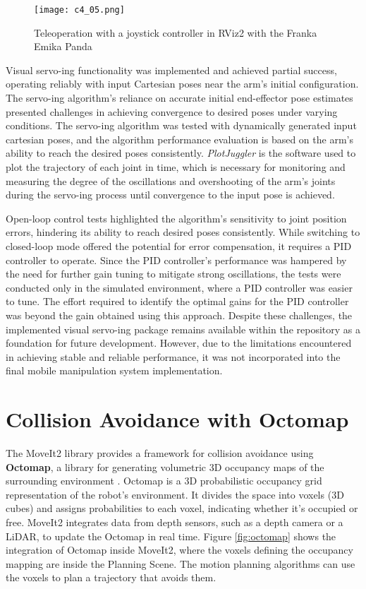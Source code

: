\begin{figure}[t]
    \centering
    \texttt{[image: c4\_05.png]}
    \caption{Teleoperation with a joystick controller in RViz2 with the Franka Emika Panda}
    \label{fig:teleop}
\end{figure}

Visual servo-ing functionality was implemented and achieved partial success, operating reliably with input 
Cartesian poses near the arm's initial configuration. The servo-ing algorithm's reliance on accurate initial
end-effector pose estimates presented challenges in achieving convergence to desired poses under varying conditions.
The servo-ing algorithm was tested with dynamically generated input cartesian poses, and the algorithm performance
evaluation is based on the arm's ability to reach the desired poses consistently. 
\textit{PlotJuggler} is the software used to plot the trajectory of each joint in time, which is necessary 
for monitoring and measuring the degree of the oscillations and overshooting of the arm's joints during the servo-ing process
until convergence to the input pose is achieved.

Open-loop control tests highlighted the algorithm's sensitivity to joint position errors, hindering its ability
to reach desired poses consistently. While switching to closed-loop mode offered the potential for error compensation, 
it requires a PID controller to operate. Since the PID controller's performance was hampered by the need for 
further gain tuning to mitigate strong oscillations, the tests were conducted only in the simulated environment,
where a PID controller was easier to tune. The effort required to identify the optimal gains for the PID controller
was beyond the gain obtained using this approach.
Despite these challenges, the implemented visual servo-ing package remains available within the repository as a foundation
for future development. However, due to the limitations encountered in achieving stable and reliable performance,
it was not incorporated into the final mobile manipulation system implementation.

\section{Collision Avoidance with Octomap}

The MoveIt2 library provides a framework for collision avoidance using \textbf{Octomap}, a library for
generating volumetric 3D occupancy maps of the surrounding environment \cite{hornung13octomap}.
Octomap is a 3D probabilistic occupancy grid representation of the robot's environment. It divides the space into voxels
(3D cubes) and assigns probabilities to each voxel, indicating whether it's occupied or free.
MoveIt2 integrates data from depth sensors, such as a depth camera or a LiDAR, to update the Octomap in real time.
Figure \ref{fig:octomap} shows the integration of Octomap inside MoveIt2, where the voxels defining the occupancy
mapping are inside the Planning Scene. The motion planning algorithms can use the voxels to plan a trajectory
that avoids them.


